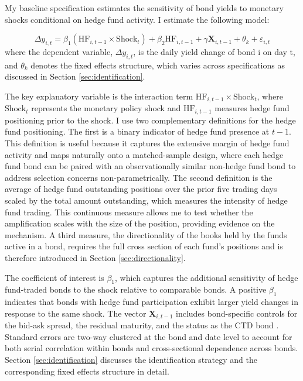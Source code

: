 \documentclass[english, 11pt, oneside]{article}
\begin{document}
My baseline specification estimates the sensitivity of bond yields to monetary shocks conditional on hedge fund activity. I estimate the following model:

\begin{equation}
\Delta y_{i,t} = \beta_1 (\text{HF}_{i,t-1} \times \text{Shock}_{t}) + \beta_2 \text{HF}_{i,t-1} + \gamma \mathbf{X}_{i,t-1} + \theta_{k} + \varepsilon_{i,t}
\end{equation}
\noindent where the dependent variable, $\Delta y_{i,t}$, is the daily yield change of bond i on day t, and $\theta_{k}$ denotes the fixed effects structure, which varies across specifications as discussed in Section \ref{sec:identification}.

The key explanatory variable is the interaction term $\text{HF}_{i,t-1} \times \text{Shock}_{t}$, where $\text{Shock}_{t}$ represents the monetary policy shock and $\text{HF}_{i,t-1}$ measures hedge fund positioning prior to the shock. I use two complementary definitions for the hedge fund positioning. The first is a binary indicator of hedge fund presence at $t{-}1$. This definition is useful because it captures the extensive margin of hedge fund activity and maps naturally onto a matched-sample design, where each hedge fund bond can be paired with an observationally similar non-hedge fund bond to address selection concerns non-parametrically. The second definition is the average of hedge fund outstanding positions over the prior five trading days scaled by the total amount outstanding, which measures the intensity of hedge fund trading. This continuous measure allows me to test whether the amplification scales with the size of the position, providing evidence on the mechanism. A third measure, the directionality of the books held by the funds active in a bond, requires the full cross section of each fund's positions and is therefore introduced in Section \ref{sec:directionality}.

The coefficient of interest is $\beta_1$, which captures the additional sensitivity of hedge fund-traded bonds to the shock relative to comparable bonds. A positive $\beta_1$ indicates that bonds with hedge fund participation exhibit larger yield changes in response to the same shock. The vector $\mathbf{X}_{i,t-1}$ includes bond-specific controls for the bid-ask spread, the residual maturity, and the status as the CTD bond \citep{pelizzon2025}. Standard errors are two-way clustered at the bond and date level to account for both serial correlation within bonds and cross-sectional dependence across bonds. Section \ref{sec:identification} discusses the identification strategy and the corresponding fixed effects structure in detail.
\end{document}
